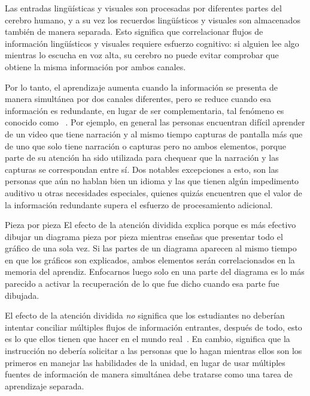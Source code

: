 Las entradas lingüísticas y visuales son procesadas por diferentes partes del cerebro humano, 
y a su vez los recuerdos lingüísticos y visuales son almacenados también de manera separada. 
Esto significa que correlacionar flujos de información lingüísticos y visuales requiere esfuerzo cognitivo: 
si alguien lee algo mientras lo escucha en voz alta, 
su cerebro no puede evitar comprobar que obtiene la misma información por ambos canales.

Por lo tanto, el aprendizaje aumenta cuando la información se presenta de manera simultánea por dos canales diferentes, 
pero se reduce cuando esa información es redundante, en lugar de ser complementaria, 
tal fenómeno es conocido como ~\cite{Maye2003}.
Por ejemplo, en general las personas encuentran difícil aprender de un video que tiene narración y 
al mismo tiempo capturas de pantalla más que de uno que solo tiene narración o capturas pero no ambos elementos, 
porque parte de su atención ha sido utilizada para chequear que la narración  
y las capturas se correspondan entre sí. Dos notables excepciones a esto, 
son las personas que aún no hablan bien un idioma y las que tienen algún impedimento auditivo u 
otras necesidades especiales, quienes quizás encuentren que el valor de la información redundante 
supera el esfuerzo de procesamiento adicional.

\begin{aside}{Pieza por pieza}
  El efecto de la atención dividida explica porque es más efectivo dibujar un diagrama 
  pieza por pieza mientras enseñas que presentar todo el gráfico de una sola vez. 
  Si las partes de un diagrama aparecen al mismo tiempo en que los gráficos son explicados, 
  ambos elementos serán correlacionados en la memoria del aprendiz. 
  Enfocarnos luego solo en una parte del diagrama es lo más parecido a activar la recuperación 
  de lo que fue dicho cuando esa parte fue dibujada. 
\end{aside}

El efecto de la atención dividida \emph{no} significa 
que los estudiantes no deberían intentar conciliar múltiples flujos de información entrantes, 
después de todo, esto es lo que ellos tienen que hacer en el mundo real~\cite{Atki2000}.
En cambio, significa que la instrucción no debería solicitar a las personas 
que lo hagan mientras ellos son los primeros en manejar las habilidades de la unidad, 
en lugar de usar múltiples fuentes  de información de manera simultánea debe tratarse como una tarea de aprendizaje separada. 

